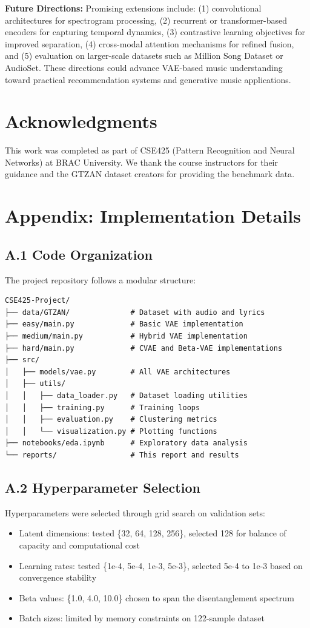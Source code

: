 \documentclass[11pt]{article}
\begin{document}
\textbf{Future Directions:} Promising extensions include: (1) convolutional architectures for spectrogram processing, (2) recurrent or transformer-based encoders for capturing temporal dynamics, (3) contrastive learning objectives for improved separation, (4) cross-modal attention mechanisms for refined fusion, and (5) evaluation on larger-scale datasets such as Million Song Dataset or AudioSet. These directions could advance VAE-based music understanding toward practical recommendation systems and generative music applications.

\section*{Acknowledgments}
This work was completed as part of CSE425 (Pattern Recognition and Neural Networks) at BRAC University. We thank the course instructors for their guidance and the GTZAN dataset creators for providing the benchmark data.

\section*{Appendix: Implementation Details}

\subsection*{A.1 Code Organization}
The project repository follows a modular structure:
\begin{verbatim}
CSE425-Project/
├── data/GTZAN/              # Dataset with audio and lyrics
├── easy/main.py             # Basic VAE implementation
├── medium/main.py           # Hybrid VAE implementation  
├── hard/main.py             # CVAE and Beta-VAE implementations
├── src/
│   ├── models/vae.py        # All VAE architectures
│   ├── utils/
│   │   ├── data_loader.py   # Dataset loading utilities
│   │   ├── training.py      # Training loops
│   │   ├── evaluation.py    # Clustering metrics
│   │   └── visualization.py # Plotting functions
├── notebooks/eda.ipynb      # Exploratory data analysis
└── reports/                 # This report and results
\end{verbatim}

\subsection*{A.2 Hyperparameter Selection}
Hyperparameters were selected through grid search on validation sets:
\begin{itemize}
\item Latent dimensions: tested \{32, 64, 128, 256\}, selected 128 for balance of capacity and computational cost
\item Learning rates: tested \{1e-4, 5e-4, 1e-3, 5e-3\}, selected 5e-4 to 1e-3 based on convergence stability
\item Beta values: \{1.0, 4.0, 10.0\} chosen to span the disentanglement spectrum
\item Batch sizes: limited by memory constraints on 122-sample dataset
\end{itemize}
\end{document}
